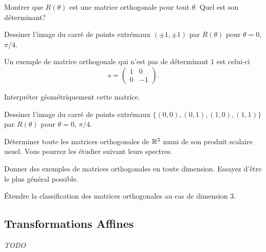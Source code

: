 \documentclass[11pt, a4paper]{article}
\begin{document}
\begin{question}
  Montrer que $R(\theta)$ est une matrice orthogonale pour tout
  $\theta$. Quel est son déterminant?
\end{question}
\begin{question}
  Dessiner l'image du carré de points extrémaux $(\pm 1, \pm 1)$ par
  $R(\theta)$ pour $\theta = 0$, $\pi/4$.
\end{question}
Un exemple de matrice orthogonale qui n'est pas de déterminant $1$ est
celui-ci
\[
s =
\begin{pmatrix}
1 & 0 \\
0 & -1
\end{pmatrix}.
\]
\begin{question}
  Interpréter géométriquement cette matrice.
\end{question}
\begin{question}
  Dessiner l'image du carré de points extrémaux
  $\{(0, 0), (0, 1), (1, 0), (1, 1)\}$
  par $R(\theta)$ pour $\theta = 0$, $\pi/4$.
\end{question}
\begin{question}
  Déterminer toute les matrices orthogonales de $\mathbb{R}^2$ muni de son
  produit scalaire usuel. Vous pourrez les étudier suivant leurs
  spectres.
\end{question}
\begin{question}
  Donner des exemples de matrices orthogonales en toute
  dimension. Essayez d'être le plus général possible.
\end{question}
\begin{question}
  Étendre la classification des matrices orthogonales au cas de
  dimension $3$.
\end{question}

\subsection{Transformations Affines}

\emph{TODO}




\end{document}
